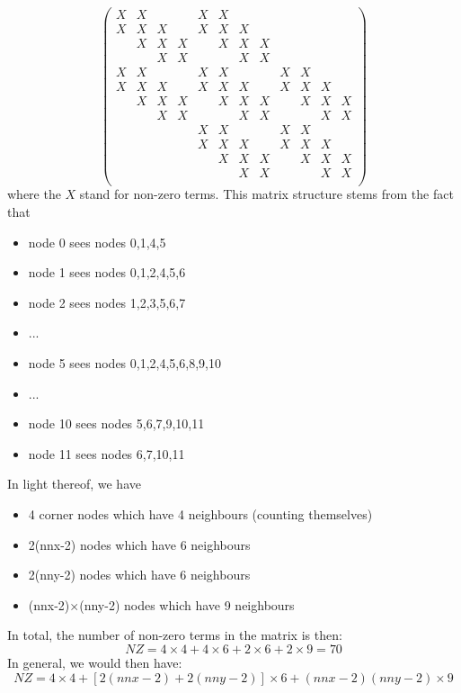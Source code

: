 \[
\left(
\begin{array}{cccccccccccc}
X & X &   &   & X & X &   &   &   &   &   &   \\
X & X & X &   & X & X & X &   &   &   &   &   \\
  & X & X & X &   & X & X & X &   &   &   &   \\
  &   & X & X &   &   & X & X &   &   &   &   \\
X & X &   &   & X & X &   &   & X & X &   &   \\
X & X & X &   & X & X & X &   & X & X & X &   \\
  & X & X & X &   & X & X & X &   & X & X & X \\
  &   & X & X &   &   & X & X &   &   & X & X \\
  &   &   &   & X & X &   &   & X & X &   &   \\
  &   &   &   & X & X & X &   & X & X & X &   \\
  &   &   &   &   & X & X & X &   & X & X & X \\
  &   &   &   &   &   & X & X &   &   & X & X \\
\end{array}
\right)
\]
where the $X$ stand for non-zero terms.
This matrix structure stems from the fact that
\begin{itemize}
\item node 0 sees nodes 0,1,4,5
\item node 1 sees nodes 0,1,2,4,5,6 
\item node 2 sees nodes 1,2,3,5,6,7 
\item ...
\item node 5 sees nodes 0,1,2,4,5,6,8,9,10 
\item ...
\item node 10 sees nodes 5,6,7,9,10,11 
\item node 11 sees nodes 6,7,10,11
\end{itemize}
In light thereof, we have
\begin{itemize}
\item 4 corner nodes which have 4 neighbours (counting themselves) 
\item 2(nnx-2) nodes which have 6 neighbours
\item 2(nny-2) nodes which have 6 neighbours
\item (nnx-2)$\times$(nny-2) nodes which have 9 neighbours
\end{itemize}
In total, the number of non-zero terms in the matrix is then:
\[
NZ=4\times4+4\times6+2\times6+2\times9=70
\]
In general, we would then have:
\[
NZ=4\times4+[2(nnx-2)+2(nny-2)]\times6 + (nnx-2)(nny-2)\times9
\]

